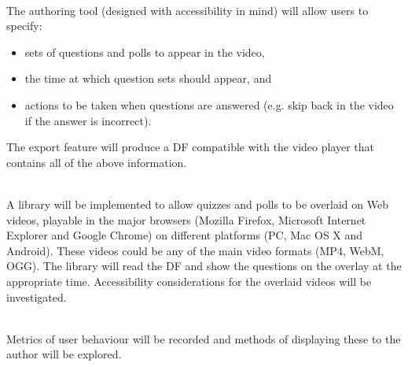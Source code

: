 \begin{description}[%
  before={\setcounter{descriptcount}{0}},%
  ,font=\bfseries\stepcounter{descriptcount}\thedescriptcount~]
	\item[Quiz Authoring Tool] \hfill \\
	The authoring tool (designed with accessibility in mind) will allow users to specify:

	\begin{itemize}
		\item sets of questions and polls to appear in the video,
		\item the time at which question sets should appear, and
		\item actions to be taken when questions are answered (e.g. skip back in the video if the answer is incorrect).
	\end{itemize}

	The export feature will produce a \gls{DF} compatible with the video player that contains all of the above information.

	\item[Overlaid Video Player] \hfill \\
	A library will be implemented to allow quizzes and polls to be overlaid on Web videos, playable in the major browsers (Mozilla Firefox, Microsoft Internet Explorer and Google Chrome) on different platforms (PC, Mac OS X and Android). These videos could be any of the main video formats (MP4, WebM, OGG). The library will read the \gls{DF} and show the questions on the overlay at the appropriate time. Accessibility considerations for the overlaid videos will be investigated.

	\item[Video and Quiz Analytics] \hfill \\
	Metrics of user behaviour will be recorded and methods of displaying these to the author will be explored.
\end{description}

